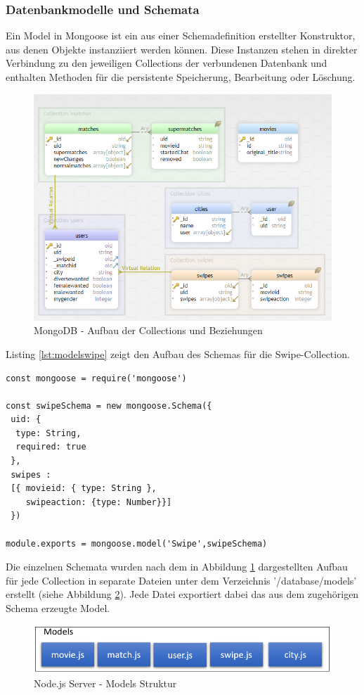 \subsubsection{Datenbankmodelle und Schemata}
Ein Model in Mongoose ist ein aus einer Schemadefinition erstellter Konstruktor, aus denen Objekte instanziiert werden können. Diese Instanzen stehen in direkter Verbindung zu den jeweiligen Collections der verbundenen Datenbank und enthalten Methoden für die persistente Speicherung, Bearbeitung oder Löschung.

\begin{figure}[tbt]
\centering
\includegraphics[width=\textwidth]{images/databasemodells.PNG}
\caption{MongoDB - Aufbau der Collections und Beziehungen}
\label{fig:databasemodells}
\end{figure}

\noindent
Listing \ref{lst:modelswipe} zeigt den Aufbau des Schemas für die Swipe-Collection. \\

\begin{lstlisting}[caption=Swipe Schema und Model, label=lst:modelswipe]
const mongoose = require('mongoose')

const swipeSchema = new mongoose.Schema({
 uid: {
  type: String,
  required: true
 },
 swipes :
 [{ movieid: { type: String },
    swipeaction: {type: Number}}]
 })

module.exports = mongoose.model('Swipe',swipeSchema)
\end{lstlisting}

\noindent
Die einzelnen Schemata wurden nach dem in Abbildung \ref{fig:databasemodells} dargestellten Aufbau für jede Collection in separate Dateien unter dem Verzeichnis '/database/models' erstellt (siehe Abbildung \ref{fig:node_structure}). Jede Datei exportiert dabei das aus dem zugehörigen Schema erzeugte Model.

\begin{figure}[tbt]
\centering
\includegraphics[width=12cm]{images/modelsstruktur.PNG}
\caption{Node.js Server - Models Struktur}
\label{fig:node_structure}
\end{figure}
